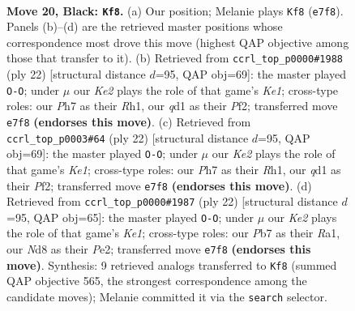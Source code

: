 \documentclass[11pt]{article}
\begin{document}
\clearpage

\begin{figure}[p]\centering
\begin{subfigure}{0.46\textwidth}\centering
\resizebox{\linewidth}{!}{%
\newchessgame
\chessboard[
  setfen={r1bnr3/1pppkppp/p2q4/B2P4/4n3/4PNP1/PP2RPBP/1R1Q2K1 b - - 16 20},
  showmover=false,
  pgfstyle=straightmove, color=movearrow, markmove={e7-f8}
]}
\caption{}
\end{subfigure}\hfill
\begin{subfigure}{0.46\textwidth}\centering
\resizebox{\linewidth}{!}{%
\newchessgame
\chessboard[
  setfen={rn1qk2r/pb3pbp/1pp3p1/3p4/Q2P4/P1N2NP1/1P2PPBP/R3K2R w KQkq - 2 12},
  showmover=false,
  pgfstyle=straightmove, color=movearrow, markmove={e1-g1}
]}
\caption{}
\end{subfigure}
\\[4pt]
\begin{subfigure}{0.46\textwidth}\centering
\resizebox{\linewidth}{!}{%
\newchessgame
\chessboard[
  setfen={rn1qk2r/pb3pbp/1pp3p1/3p4/Q2P4/P1N2NP1/1P2PPBP/R3K2R w KQkq - 2 12},
  showmover=false,
  pgfstyle=straightmove, color=movearrow, markmove={e1-g1}
]}
\caption{}
\end{subfigure}\hfill
\begin{subfigure}{0.46\textwidth}\centering
\resizebox{\linewidth}{!}{%
\newchessgame
\chessboard[
  setfen={rn1q1rk1/pb3p1p/1pp2bp1/3p4/Q2P4/P1N2NP1/1P2PPBP/R3K2R w KQ - 0 12},
  showmover=false,
  pgfstyle=straightmove, color=movearrow, markmove={e1-g1}
]}
\caption{}
\end{subfigure}
\caption{\textbf{Move 20, Black: \texttt{Kf8}.} (a) Our position; Melanie plays \texttt{Kf8} (\texttt{e7f8}). Panels (b)--(d) are the retrieved master positions whose correspondence most drove this move (highest QAP objective among those that transfer to it). (b) Retrieved from \texttt{ccrl\_top\_p0000\#1988} (ply 22) [structural distance $d$=95, QAP obj=69]: the master played \texttt{O-O}; under $\mu$ our \emph{Ke2} plays the role of that game's \emph{Ke1}; cross-type roles: our \emph{P}h7 as their \emph{R}h1, our \emph{q}d1 as their \emph{P}f2; transferred move \texttt{e7f8} \textbf{(endorses this move)}. (c) Retrieved from \texttt{ccrl\_top\_p0003\#64} (ply 22) [structural distance $d$=95, QAP obj=69]: the master played \texttt{O-O}; under $\mu$ our \emph{Ke2} plays the role of that game's \emph{Ke1}; cross-type roles: our \emph{P}h7 as their \emph{R}h1, our \emph{q}d1 as their \emph{P}f2; transferred move \texttt{e7f8} \textbf{(endorses this move)}. (d) Retrieved from \texttt{ccrl\_top\_p0000\#1987} (ply 22) [structural distance $d$=95, QAP obj=65]: the master played \texttt{O-O}; under $\mu$ our \emph{Ke2} plays the role of that game's \emph{Ke1}; cross-type roles: our \emph{P}b7 as their \emph{R}a1, our \emph{N}d8 as their \emph{P}e2; transferred move \texttt{e7f8} \textbf{(endorses this move)}. Synthesis: 9 retrieved analogs transferred to \texttt{Kf8} (summed QAP objective 565, the strongest correspondence among the candidate moves); Melanie committed it via the \texttt{search} selector.}
\label{fig:thought-m39}
\end{figure}
\end{document}

